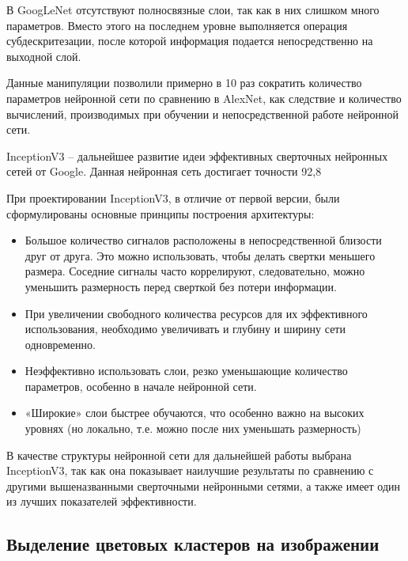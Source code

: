 В GoogLeNet отсутствуют полносвязные слои, так как в них слишком много параметров. 
Вместо этого на последнем уровне выполняется операция субдескритезации, после которой информация подается непосредственно на выходной слой.

Данные манипуляции позволили примерно в 10 раз сократить количество параметров нейронной сети по сравнению в AlexNet, как следствие и количество вычислений, производимых при обучении и непосредственной работе нейронной сети.

InceptionV3 – дальнейшее развитие идеи эффективных сверточных нейронных сетей от Google. Данная нейронная сеть достигает точности 92,8%
 

При проектировании InceptionV3, в отличие от первой версии, были сформулированы основные принципы построения архитектуры:
\begin{itemize}
    \item Большое количество сигналов расположены в непосредственной близости друг от друга. Это можно использовать, чтобы делать свертки меньшего размера. Соседние сигналы часто коррелируют, следовательно, можно уменьшить размерность перед сверткой без потери информации.
    \item При увеличении свободного количества ресурсов для их эффективного использования, необходимо увеличивать и глубину и ширину сети одновременно. 
    \item Неэффективно использовать слои, резко уменьшающие количество параметров, особенно в начале нейронной сети.
    \item «Широкие» слои быстрее обучаются, что особенно важно на высоких уровнях (но локально, т.е. можно после них уменьшать размерность)
\end{itemize}


В качестве структуры нейронной сети для дальнейшей работы выбрана InceptionV3, так как она показывает наилучшие результаты по сравнению с другими вышеназванными сверточными нейронными сетями, а также имеет один из лучших показателей эффективности.

\subsection{Выделение цветовых кластеров на изображении}

